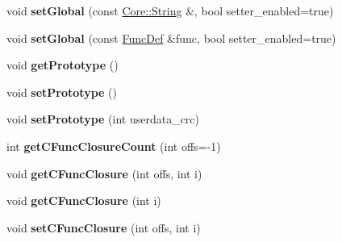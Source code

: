 \begin{DoxyCompactItemize}
\item 
void {\bfseries set\+Global} (const \hyperlink{class_object_script_1_1_o_s_1_1_core_1_1_string}{Core\+::\+String} \&, bool setter\+\_\+enabled=true)\hypertarget{class_object_script_1_1_o_s_abf3831b7a1523d56931bfacce6e63196}{}\label{class_object_script_1_1_o_s_abf3831b7a1523d56931bfacce6e63196}

\item 
void {\bfseries set\+Global} (const \hyperlink{struct_object_script_1_1_o_s_1_1_func_def}{Func\+Def} \&func, bool setter\+\_\+enabled=true)\hypertarget{class_object_script_1_1_o_s_a64a465f696082696cb1a9fe7bdb07189}{}\label{class_object_script_1_1_o_s_a64a465f696082696cb1a9fe7bdb07189}

\item 
void {\bfseries get\+Prototype} ()\hypertarget{class_object_script_1_1_o_s_a6de0cc50b325d0bce9ad1976b34425a8}{}\label{class_object_script_1_1_o_s_a6de0cc50b325d0bce9ad1976b34425a8}

\item 
void {\bfseries set\+Prototype} ()\hypertarget{class_object_script_1_1_o_s_a77b5f6f3a813820268819bc3536166f5}{}\label{class_object_script_1_1_o_s_a77b5f6f3a813820268819bc3536166f5}

\item 
void {\bfseries set\+Prototype} (int userdata\+\_\+crc)\hypertarget{class_object_script_1_1_o_s_ab77c906e24380ee04b395822a9a50303}{}\label{class_object_script_1_1_o_s_ab77c906e24380ee04b395822a9a50303}

\item 
int {\bfseries get\+C\+Func\+Closure\+Count} (int offs=-\/1)\hypertarget{class_object_script_1_1_o_s_a32510249a99072469626e614c53674d5}{}\label{class_object_script_1_1_o_s_a32510249a99072469626e614c53674d5}

\item 
void {\bfseries get\+C\+Func\+Closure} (int offs, int i)\hypertarget{class_object_script_1_1_o_s_a95a2a88e0462391694e0939aa0cab262}{}\label{class_object_script_1_1_o_s_a95a2a88e0462391694e0939aa0cab262}

\item 
void {\bfseries get\+C\+Func\+Closure} (int i)\hypertarget{class_object_script_1_1_o_s_a8808c7e0fee915c2bcb132248ece0249}{}\label{class_object_script_1_1_o_s_a8808c7e0fee915c2bcb132248ece0249}

\item 
void {\bfseries set\+C\+Func\+Closure} (int offs, int i)\hypertarget{class_object_script_1_1_o_s_af159b93320cb3a12b9f0ef11c3e9aa8a}{}\label{class_object_script_1_1_o_s_af159b93320cb3a12b9f0ef11c3e9aa8a}


\end{DoxyCompactItemize}
